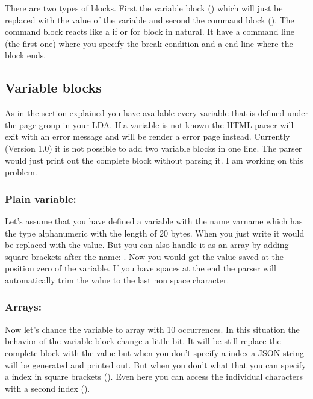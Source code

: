 \documentclass[letterpaper,10pt,english]{sphinxmanual}
\begin{document}
There are two types of blocks. First the variable block () which will just be replaced with the value of the variable and second the command block (). The command block reacts like a if or  for block in natural. It have a command line (the first one) where you specify the break condition and a end line where the block ends.


\subsection{Variable blocks}
\label{\detokenize{html-parser:variable-blocks}}
As in the section {\hyperref[\detokenize{natural:template-vars}]{}} explained you have available every variable that is defined under the page group in your LDA. If a variable is not known the HTML parser will exit with an error message and will be render a error page instead. Currently (Version 1.0) it is not possible to add two variable blocks in one line. The parser would just print out the complete block without parsing it. I am working on this problem.


\subsubsection{Plain variable:}
\label{\detokenize{html-parser:plain-variable}}
Let's assume that you have defined a variable with the name \sphinxquotedblleft{}varname\sphinxquotedblright{} which has the type alphanumeric with the length of 20 bytes. When you just write  it would be replaced with the value. But you can also handle it as an array by adding square brackets after the name: . Now you would get the value saved at the position zero of the variable. If you have spaces at the end the parser will automatically trim the value to the last non space character.


\subsubsection{Arrays:}
\label{\detokenize{html-parser:arrays}}
Now let's chance the variable to array with 10 occurrences. In this situation the behavior of the variable block change a little bit. It will be still replace the complete block with the value but when you don't specify a index a JSON string will be generated and printed out. But when you don't what that you can specify a index in square brackets (). Even here you can access the individual characters with a second index ().
\end{document}
